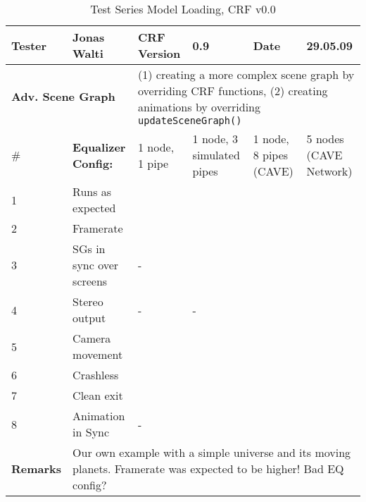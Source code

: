 \begin{table}[H]
	\centering
	\begin{tabular}{|b{}|b{}|m{}|m{}|m{}|m{}|}
		\hline
		\bfseries Tester & Jonas Walti & \bfseries CRF Version & 0.9 & \bfseries Date & 29.05.09 \\
		\hline
		\hline
		\multicolumn{2}{|l|}{\large{\bfseries Adv. Scene Graph}} & \multicolumn{4}{p{0.6\textwidth}|}{(1) creating a more complex scene graph by overriding CRF functions, (2) creating animations by overriding \texttt{updateSceneGraph()}}\\
		\hline
		\hline
		\# & \bfseries Equalizer Config: & 1 node, 1 pipe & 1 node, 3 simulated pipes &  1 node, 8 pipes (CAVE) &  5 nodes (CAVE Network) \\
		\hline 1 & Runs as expected & \tick & \tick & \tick & \tick \\
		\hline 2 & Framerate & \quad\quad 60 & \quad\quad 20 & \quad\quad 60 & \quad\quad 200 \\
		\hline 3 & SGs in sync over screens & \quad\quad- & \tick & \tick & \tick \\
		\hline 4 & Stereo output & \quad\quad- & \quad\quad- & \tick & \tick \\
		\hline 5 & Camera movement & \tick & \tick & \tick & \tick\\
		\hline 6 & Crashless & \tick & \tick & \tick & \tick\\
		\hline 7 & Clean exit & \tick & \tick & \tick & \tick \\
		\hline 8 & Animation in Sync & \quad\quad- & \tick & \tick & \tick \\
		\hline
		\hline \bfseries Remarks & \multicolumn{5}{p{0.85\textwidth}|}{Our own example with a simple universe and its moving planets. Framerate was expected to be higher! Bad EQ config?}\\
		\hline
	\end{tabular}
	\caption{Test Series Model Loading, CRF v0.0}
\end{table}

